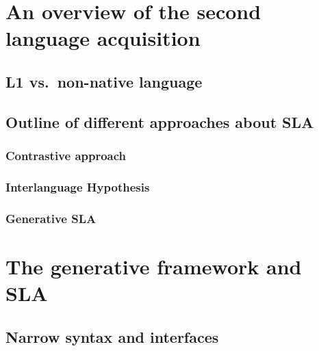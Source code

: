 \documentclass[
  a4paper,
  twoside,
  12pt,
  chapterprefix=false,
  bibliography=totocnumbered,
  listof=flat]{scrbook}
\begin{document}
\hypertarget{an-overview-of-the-second-language-acquisition}{%
\chapter{An overview of the second language acquisition}\label{an-overview-of-the-second-language-acquisition}}

\hypertarget{l1-vs.-non-native-language}{%
\section{L1 vs.~non-native language}\label{l1-vs.-non-native-language}}

\hypertarget{outline-of-different-approaches-about-sla}{%
\section{Outline of different approaches about SLA}\label{outline-of-different-approaches-about-sla}}

\hypertarget{contrastive-approach}{%
\subsection{Contrastive approach}\label{contrastive-approach}}

\hypertarget{interlanguage-hypothesis}{%
\subsection{Interlanguage Hypothesis}\label{interlanguage-hypothesis}}

\hypertarget{generative-sla}{%
\subsection{Generative SLA}\label{generative-sla}}

\hypertarget{the-generative-framework-and-sla}{%
\chapter{The generative framework and SLA}\label{the-generative-framework-and-sla}}

\hypertarget{narrow-syntax-and-interfaces}{%
\section{Narrow syntax and interfaces}\label{narrow-syntax-and-interfaces}}
\end{document}
